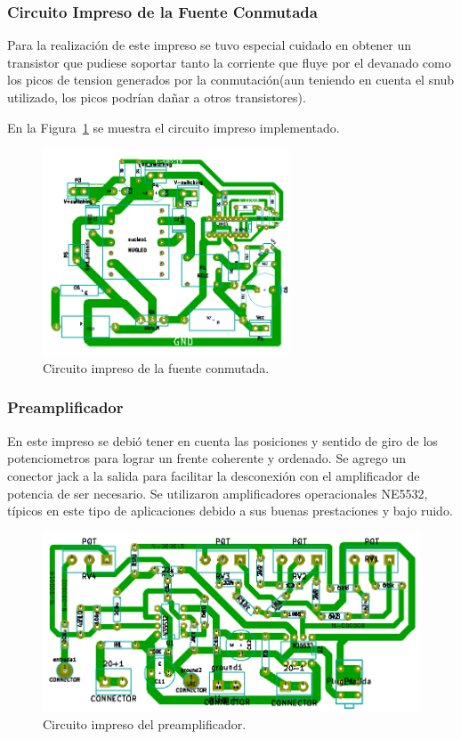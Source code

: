 \subsubsection{Circuito Impreso de la Fuente Conmutada}
\medskip
Para la realización de este impreso se tuvo especial cuidado en obtener un transistor que pudiese soportar tanto la corriente que fluye por el devanado como los picos de tension generados por la conmutación(aun teniendo en cuenta el snub utilizado, los picos podrían dañar a otros transistores).

En la Figura~\ref{pcb_conmutada} se muestra el circuito impreso implementado. 

\begin{figure}[H]
\centering
\centerline{\includegraphics[width=0.65\textwidth]{img/pcb_conmutada.png}}
\caption{Circuito impreso de la fuente conmutada.}
\label{pcb_conmutada} 
\end{figure}
\bigskip
\subsubsection{Preamplificador}
\medskip
En este impreso se debió tener en cuenta las posiciones y sentido de giro de los potenciometros para lograr un frente coherente y ordenado. Se agrego un conector jack a la salida para facilitar la desconexión con el amplificador de potencia de ser necesario.
Se utilizaron amplificadores operacionales NE5532, típicos en este tipo de aplicaciones debido a sus buenas prestaciones y bajo ruido.

\begin{figure}[H]
\centering
\centerline{\includegraphics[width=1\textwidth]{img/pre_pcb.png}}
\caption{Circuito impreso del preamplificador.}
\label{pre_pcb} 
\end{figure}